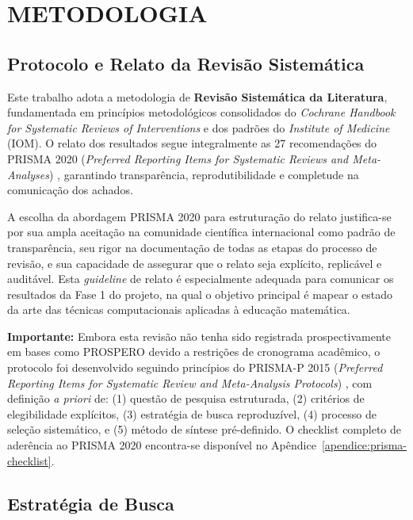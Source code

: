 \chapter{METODOLOGIA}
\label{cap:metodologia}

\section{Protocolo e Relato da Revisão Sistemática}

Este trabalho adota a metodologia de \textbf{Revisão Sistemática da Literatura}, fundamentada em princípios metodológicos consolidados do \textit{Cochrane Handbook for Systematic Reviews of Interventions} \cite{CochraneHandbook} e dos padrões do \textit{Institute of Medicine} (IOM). O relato dos resultados segue integralmente as 27 recomendações do PRISMA 2020 (\textit{Preferred Reporting Items for Systematic Reviews and Meta-Analyses}) \cite{PRISMA2020}, garantindo transparência, reprodutibilidade e completude na comunicação dos achados.

A escolha da abordagem PRISMA 2020 para estruturação do relato justifica-se por sua ampla aceitação na comunidade científica internacional como padrão de transparência, seu rigor na documentação de todas as etapas do processo de revisão, e sua capacidade de assegurar que o relato seja explícito, replicável e auditável. Esta \textit{guideline} de relato é especialmente adequada para comunicar os resultados da Fase 1 do projeto, na qual o objetivo principal é mapear o estado da arte das técnicas computacionais aplicadas à educação matemática.

\textbf{Importante:} Embora esta revisão não tenha sido registrada prospectivamente em bases como PROSPERO devido a restrições de cronograma acadêmico, o protocolo foi desenvolvido seguindo princípios do PRISMA-P 2015 (\textit{Preferred Reporting Items for Systematic Review and Meta-Analysis Protocols}) \cite{PRISMAP2015}, com definição \textit{a priori} de: (1) questão de pesquisa estruturada, (2) critérios de elegibilidade explícitos, (3) estratégia de busca reproduzível, (4) processo de seleção sistemático, e (5) método de síntese pré-definido. O checklist completo de aderência ao PRISMA 2020 encontra-se disponível no Apêndice~\ref{apendice:prisma-checklist}.

\section{Estratégia de Busca}

